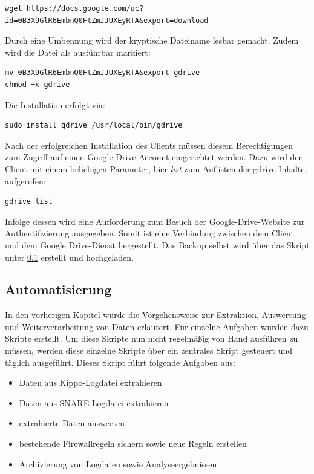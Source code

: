 \begin{lstlisting}[style=customc]
wget https://docs.google.com/uc?id=0B3X9GlR6EmbnQ0FtZmJJUXEyRTA&export=download
\end{lstlisting}

Durch eine Umbennung wird der kryptische Dateiname lesbar gemacht. Zudem wird die Datei als ausführbar markiert:

\begin{lstlisting}[style=customc]
mv 0B3X9GlR6EmbnQ0FtZmJJUXEyRTA&export gdrive
chmod +x gdrive
\end{lstlisting}

Die Installation erfolgt via:

\begin{lstlisting}[style=customc]
sudo install gdrive /usr/local/bin/gdrive
\end{lstlisting}

Nach der erfolgreichen Installation des Clients müssen diesem Berechtigungen zum Zugriff auf einen Google Drive Account eingerichtet werden. Dazu wird der Client mit einem beliebigen Parameter, hier \textit{list} zum Auflisten der gdrive-Inhalte, aufgerufen:

\begin{lstlisting}[style=customc]
gdrive list
\end{lstlisting}

Infolge dessen wird eine Aufforderung zum Besuch der Google-Drive-Website zur Authentifizierung ausgegeben. Somit ist eine Verbindung zwischen dem Client und dem Google Drive-Dienst hergestellt. Das Backup selbst wird über das Skript unter \ref{subsec:Automatisierung} erstellt und hochgeladen.


\subsection{Automatisierung}
\label{subsec:Automatisierung}

In den vorherigen Kapitel wurde die Vorgehensweise zur Extraktion, Auswertung und Weiterverarbeitung von Daten erläutert. Für einzelne Aufgaben wurden dazu Skripte erstellt. Um diese Skripte nun nicht regelmäßig von Hand ausführen zu müssen, werden diese einzelne Skripte über ein zentrales Skript gesteuert und täglich ausgeführt. Dieses Skript führt folgende Aufgaben aus:

\begin{itemize}
\item Daten aus Kippo-Logdatei extrahieren
\item Daten aus SNARE-Logdatei extrahieren
\item extrahierte Daten auswerten
\item bestehende Firewallregeln sichern sowie neue Regeln erstellen
\item Archivierung von Logdaten sowie Analyseergebnissen
\end{itemize}

